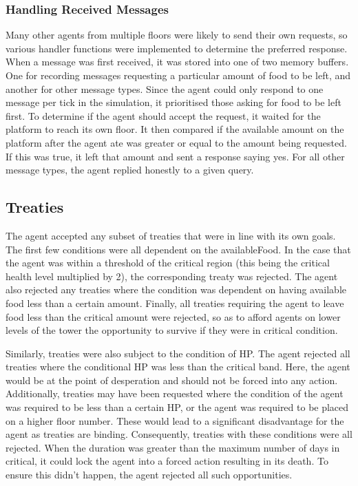 \subsubsection{Handling Received Messages}
Many other agents from multiple floors were likely to send their own requests, so various handler functions were implemented to determine the preferred response. When a message was first received, it was stored into one of two memory buffers. One for recording messages requesting a particular amount of food to be left, and another for other message types. Since the agent could only respond to one message per tick in the simulation, it prioritised those asking for food to be left first. To determine if the agent should accept the request, it waited for the platform to reach its own floor. It then compared if the available amount on the platform after the agent ate was greater or equal to the amount being requested. If this was true, it left that amount and sent a response saying yes. For all other message types, the agent replied honestly to a given query. 

\subsection{Treaties} \label{team4Treaties}
The agent accepted any subset of treaties that were in line with its own goals. The first few conditions were all dependent on the availableFood. In the case that the agent was within a threshold of the critical region (this being the critical health level multiplied by 2), the corresponding treaty was rejected. The agent also rejected any treaties where the condition was dependent on having available food less than a certain amount. Finally, all treaties requiring the agent to leave food less than the critical amount were rejected, so as to afford agents on lower levels of the tower the opportunity to survive if they were in critical condition. 

Similarly, treaties were also subject to the condition of HP. The agent rejected all treaties where the conditional HP was less than the critical band. Here, the agent would be at the point of desperation and should not be forced into any action. Additionally, treaties may have been requested where the condition of the agent was required to be less than a certain HP, or the agent was required to be placed on a higher floor number. These would lead to a significant disadvantage for the agent as treaties are binding. Consequently, treaties with these conditions were all rejected. When the duration was greater than the maximum number of days in critical, it could lock the agent into a forced action resulting in its death. To ensure this didn't happen, the agent rejected all such opportunities. 

